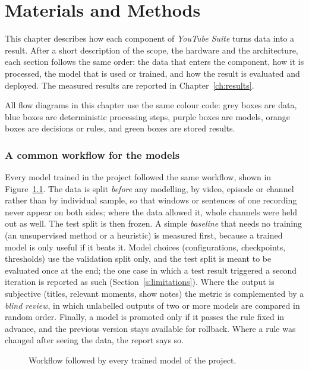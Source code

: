 \chapter{Materials and Methods}
\label{ch:methods}

This chapter describes how each component of \textit{YouTube Suite} turns data into a result. After a short description of the scope, the hardware and the architecture, each section follows the same order: the data that enters the component, how it is processed, the model that is used or trained, and how the result is evaluated and deployed. The measured results are reported in Chapter~\ref{ch:results}.

All flow diagrams in this chapter use the same colour code: grey boxes are data, blue boxes are deterministic processing steps, purple boxes are models, orange boxes are decisions or rules, and green boxes are stored results.

\subsection*{A common workflow for the models}

Every model trained in the project followed the same workflow, shown in Figure~\ref{fig:workflow}. The data is split \textit{before} any modelling, by video, episode or channel rather than by individual sample, so that windows or sentences of one recording never appear on both sides; where the data allowed it, whole channels were held out as well. The test split is then frozen. A simple \textit{baseline} that needs no training (an unsupervised method or a heuristic) is measured first, because a trained model is only useful if it beats it. Model choices (configurations, checkpoints, thresholds) use the validation split only, and the test split is meant to be evaluated once at the end; the one case in which a test result triggered a second iteration is reported as such (Section~\ref{s:limitations}). Where the output is subjective (titles, relevant moments, show notes) the metric is complemented by a \textit{blind review}, in which unlabelled outputs of two or more models are compared in random order. Finally, a model is promoted only if it passes the rule fixed in advance, and the previous version stays available for rollback. Where a rule was changed after seeing the data, the report says so.

\begin{figure}[H]
\centering
{}
\caption{Workflow followed by every trained model of the project.}
\label{fig:workflow}
\end{figure}

